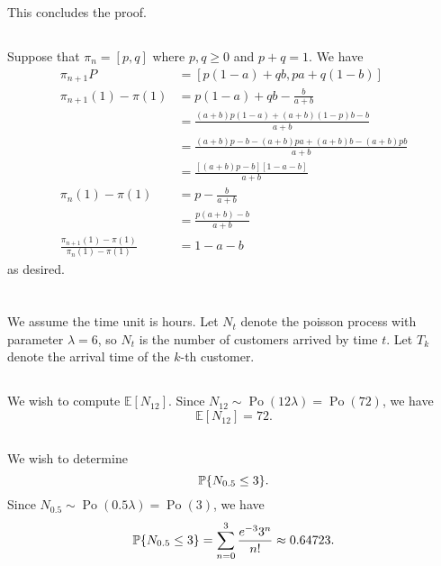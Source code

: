 \documentclass[10pt]{article}
\DeclarePairedDelimiter{\set}{\lbrace}{\rbrace}
\DeclareMathOperator{\Po}{Po}
\newcommand{\E}{\mathbb{E}}
\renewcommand{\P}{\mathbb{P}}
\begin{document}
This concludes the proof.

\subsection{}
Suppose that $\pi_{n} = [p, q]$ where $p, q\geq 0$ and $p+q = 1$.
We have
\begin{align*}
  \pi_{n+1} P
  &= [p(1-a) + qb, pa + q(1-b)] \\
  \pi_{n+1}(1) - \pi(1)
  &= p(1-a) + qb - \frac{b}{a+b} \\
  &= \frac{(a+b)p(1-a) + (a+b)(1-p)b - b}{a+b} \\
  &= \frac{(a+b)p - b - (a+b)pa + (a+b)b - (a+b)pb}{a+b} \\
  &= \frac{[(a+b)p - b][1-a-b]}{a+b} \\
  \pi_n(1) - \pi(1)
  &= p - \frac{b}{a+b} \\
  &= \frac{p(a+b) - b}{a+b} \\
  \frac{\pi_{n+1}(1) - \pi(1)}{\pi_n(1) - \pi(1)}
  &= 1-a-b
\end{align*}
as desired.

\clearpage
\section{}
We assume the time unit is hours.
Let $N_t$ denote the poisson process with parameter $\lambda=6$,
so $N_t$ is the number of customers arrived by time $t$.
Let $T_k$ denote the arrival time of the $k$-th customer.

\subsection{}
We wish to compute $\E[N_{12}]$.
Since $N_{12}\sim \Po(12\lambda) = \Po(72)$,
we have
\[
  \E[N_{12}] = 72.
\]

\subsection{}
We wish to determine
\[
  \P\set{N_{0.5}\leq 3}.
\]
Since $N_{0.5}\sim \Po(0.5\lambda) = \Po(3)$,
we have
\[
  \P\set{N_{0.5}\leq 3} = \sum_{n=0}^3 \frac{e^{-3} 3^n}{n!}
  \approx 0.64723.
\]
\end{document}
